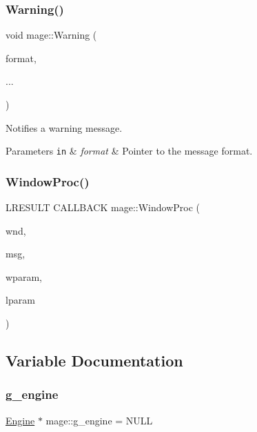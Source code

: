 \hypertarget{namespacemage_a0eccd8065c75d5f2bf86b48a5be3bfe5}{}\label{namespacemage_a0eccd8065c75d5f2bf86b48a5be3bfe5} 
\subsubsection{\texorpdfstring{Warning()}{Warning()}}
{\footnotesize\ttfamily void mage\+::\+Warning (\begin{DoxyParamCaption}\item[{const char $\ast$}]{format,  }\item[{}]{... }\end{DoxyParamCaption})}

Notifies a warning message.


\begin{DoxyParams}[1]{Parameters}
\mbox{\tt in}  & {\em format} & Pointer to the message format. \\
\hline
\end{DoxyParams}
\hypertarget{namespacemage_a3b7426a2b3c10a52791dac481c2495a3}{}\label{namespacemage_a3b7426a2b3c10a52791dac481c2495a3} 
\subsubsection{\texorpdfstring{Window\+Proc()}{WindowProc()}}
{\footnotesize\ttfamily L\+R\+E\+S\+U\+LT C\+A\+L\+L\+B\+A\+CK mage\+::\+Window\+Proc (\begin{DoxyParamCaption}\item[{H\+W\+ND}]{wnd,  }\item[{U\+I\+NT}]{msg,  }\item[{W\+P\+A\+R\+AM}]{wparam,  }\item[{L\+P\+A\+R\+AM}]{lparam }\end{DoxyParamCaption})}



\subsection{Variable Documentation}
\hypertarget{namespacemage_a84bf83f1e8779d884452cdf08f56c19a}{}\label{namespacemage_a84bf83f1e8779d884452cdf08f56c19a} 
\subsubsection{\texorpdfstring{g\+\_\+engine}{g\_engine}}
{\footnotesize\ttfamily \hyperlink{classmage_1_1_engine}{Engine} $\ast$ mage\+::g\+\_\+engine = N\+U\+LL}

